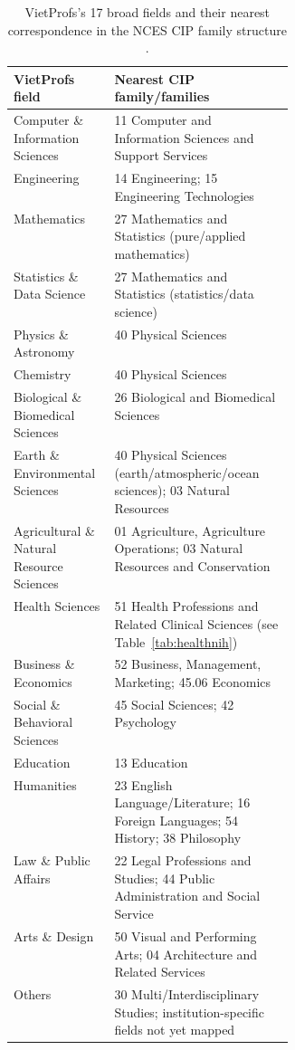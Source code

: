\documentclass[11pt]{article}
\begin{document}
\begin{table}[t]
\centering
\caption{VietProfs's 17 broad fields and their nearest correspondence in the NCES CIP family structure \cite{nces_cip2020}.}
\label{tab:fieldmap}
\small
\begin{tabularx}{\linewidth}{@{}p{0.36\linewidth}X@{}}
\toprule
VietProfs field & Nearest CIP family/families \\
\midrule
Computer \& Information Sciences & 11 Computer and Information Sciences and Support Services \\
Engineering & 14 Engineering; 15 Engineering Technologies \\
Mathematics & 27 Mathematics and Statistics (pure/applied mathematics) \\
Statistics \& Data Science & 27 Mathematics and Statistics (statistics/data science) \\
Physics \& Astronomy & 40 Physical Sciences \\
Chemistry & 40 Physical Sciences \\
Biological \& Biomedical Sciences & 26 Biological and Biomedical Sciences \\
Earth \& Environmental Sciences & 40 Physical Sciences (earth/atmospheric/ocean sciences); 03 Natural Resources \\
Agricultural \& Natural Resource Sciences & 01 Agriculture, Agriculture Operations; 03 Natural Resources and Conservation \\
Health Sciences & 51 Health Professions and Related Clinical Sciences (see Table~\ref{tab:healthnih}) \\
Business \& Economics & 52 Business, Management, Marketing; 45.06 Economics \\
Social \& Behavioral Sciences & 45 Social Sciences; 42 Psychology \\
Education & 13 Education \\
Humanities & 23 English Language/Literature; 16 Foreign Languages; 54 History; 38 Philosophy \\
Law \& Public Affairs & 22 Legal Professions and Studies; 44 Public Administration and Social Service \\
Arts \& Design & 50 Visual and Performing Arts; 04 Architecture and Related Services \\
Others & 30 Multi/Interdisciplinary Studies; institution-specific fields not yet mapped \\
\bottomrule
\end{tabularx}
\end{table}
\end{document}
